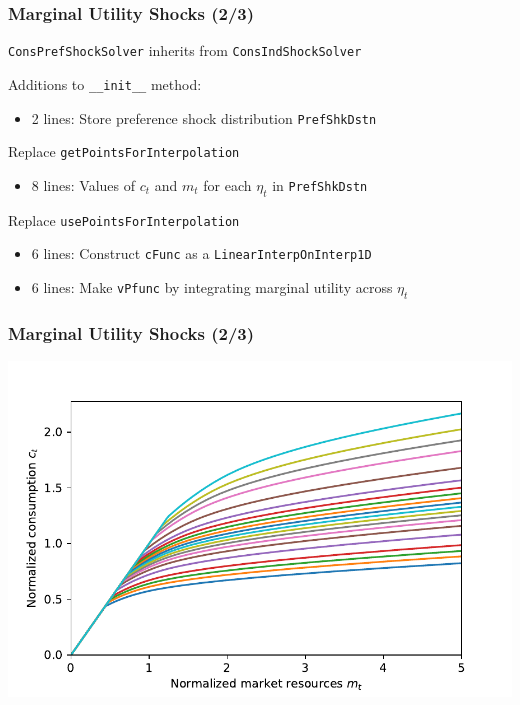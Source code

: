 \documentclass{beamer}
\begin{document}
\begin{frame}
  \frametitle{Marginal Utility Shocks (2/3)}
  \texttt{ConsPrefShockSolver} inherits from \texttt{ConsIndShockSolver}

  \begin{block}{Additions to \texttt{\_\_init\_\_} method:}
    \begin{itemize}
    \item 2 lines: Store preference shock distribution \texttt{PrefShkDstn}
    \end{itemize}
  \end{block}

  \begin{block}{Replace \texttt{getPointsForInterpolation}}
    \begin{itemize}
    \item 8 lines: Values of $c_t$ and $m_t$ for each $\eta_t$ in \texttt{PrefShkDstn}
    \end{itemize}
  \end{block}

  \begin{block}{Replace \texttt{usePointsForInterpolation}}
    \begin{itemize}
    \item 6 lines: Construct \texttt{cFunc} as a \texttt{LinearInterpOnInterp1D}

    \item 6 lines: Make \texttt{vPfunc} by integrating marginal utility across $\eta_t$
    \end{itemize}
  \end{block}
\end{frame}

\begin{frame}
  \frametitle{Marginal Utility Shocks (2/3)}
  \begin{center}
    \includegraphics[scale=0.75]{PrefShockcFunc.pdf}
  \end{center}
\end{frame}
\end{document}
